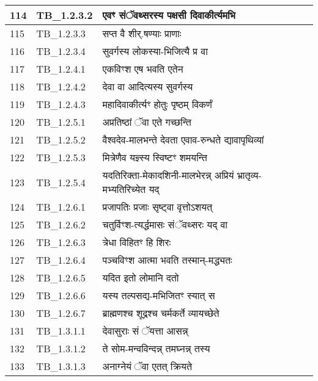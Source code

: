 \documentclass[17pt]{extarticle}
\begin{document}
\begin{longtable}{||p{0.4in}||p{0.9in}||p{4.0in}||p{0.9in}||}
            114 & TB\_1.2.3.2 & एवꣳ संॅवथ्सरस्य पक्षसी दिवाकीर्त्यमभि &      \\
        \hline
            115 & TB\_1.2.3.3 & सप्त वै शीर्.षण्याः प्राणाः &      \\
        \hline
            116 & TB\_1.2.3.4 & सुवर्गस्य लोकस्या{-}भिजित्यै प्र वा &      \\
        \hline
            117 & TB\_1.2.4.1 & एकविꣳश एष भवति एतेन &      \\
        \hline
            118 & TB\_1.2.4.2 & देवा वा आदित्यस्य सुवर्गस्य &      \\
        \hline
            119 & TB\_1.2.4.3 & महादिवाकीर्त्यꣳ होतुः पृष्ठम् विकर्णं &      \\
        \hline
            120 & TB\_1.2.5.1 & अप्रतिष्ठां ॅवा एते गच्छन्ति &      \\
        \hline
            121 & TB\_1.2.5.2 & वैश्वदेव{-}मालभन्ते देवता एवाव{-}रुन्धते द्यावापृथिव्यां &      \\
        \hline
            122 & TB\_1.2.5.3 & मित्रेणैव यज्ञ्स्य स्विष्टꣳ शमयन्ति &      \\
        \hline
            123 & TB\_1.2.5.4 & यदतिरिक्ता{-}मेकादशिनी{-}मालभेरन्न् अप्रियं भ्रातृव्य{-}मभ्यतिरिच्येत यद् &      \\
        \hline
            124 & TB\_1.2.6.1 & प्रजापतिः प्रजाः सृष्ट्वा वृत्तोऽशयत् &      \\
        \hline
            125 & TB\_1.2.6.2 & चतुर्विꣳश{-}त्यर्द्धमासः संॅवथ्सरः यद् वा &      \\
        \hline
            126 & TB\_1.2.6.3 & त्रेधा विहितꣳ हि शिरः &      \\
        \hline
            127 & TB\_1.2.6.4 & पञ्चविꣳश आत्मा भवति तस्मान्{-}मद्ध्यतः &      \\
        \hline
            128 & TB\_1.2.6.5 & यदित इतो लोमानि दतो &      \\
        \hline
            129 & TB\_1.2.6.6 & यस्य तल्पसद्य{-}मभिजितꣳ स्यात् स &      \\
        \hline
            130 & TB\_1.2.6.7 & ब्राह्मणश्च शूद्रश्च चर्मकर्ते व्यायच्छेते &      \\
        \hline
            131 & TB\_1.3.1.1 & देवासुराः सं ॅयत्ता आसन्न् &      \\
        \hline
            132 & TB\_1.3.1.2 & ते सोम{-}मन्वविन्दन्न् तमघ्नन्न् तस्य &      \\
        \hline
            133 & TB\_1.3.1.3 & अनाग्नेयं ॅवा एतत् क्रियते &      \\

\end{longtable}
\end{document}
